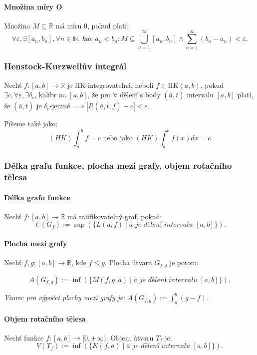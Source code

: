 \documentclass[10pt,a4paper]{article}
\newcommand{\N}{{\mathbb{N}}}
\newcommand{\R}{{\mathbb{R}}}
\begin{document}
\paragraph*{Množina míry O} Množina $M \subseteq \R$ má míru $0$, pokud platí: 
$$\forall \varepsilon, \exists [a_n, b_n], \forall n\in \N \textit{, kde } a_n < b_n: M\subseteq \bigcup_{n=1}^{\infty}[a_n, b_n] \land \sum_{n=1}^{\infty} (b_n - a_n) < \varepsilon.$$
\subsubsection{Henstock-Kurzweilův integrál} 
Nechť $f:[a,b] \to \R$ je HK-integrovatelná, neboli $f\in \text{HK}(a,b)$, pokud $\exists c, \forall \varepsilon, \exists \delta_c$, kalibr na $[a,b]$, 
že pro $\forall$ dělení s body $(\overline{a}, \overline{t})$ intervalu $[a, b]$ platí, že
$(\overline{a}, \overline{t}) \text{ je } \delta_c \text{-jemné } \implies |R(\overline{a}, \overline{t}, f) - c| < \varepsilon.$ 

Píšeme také jako:
\[
    (HK) \int_{a}^{b} f = c \text{ nebo jako } (HK)\int_{a}^{b} f(x) dx = c
\]

\subsubsection{Délka grafu funkce, plocha mezi grafy, objem rotačního tělesa}

\paragraph*{Délka grafu funkce} Nechť $f:[a,b]\to \R$ má ratifikovatelný graf, pokud:
\[
    \ell(G_f) := \sup (\{ L(\overline{a}, f) \mid \overline{a} \textit{ je dělení intervalu } [a,b] \}).
\]
\paragraph*{Plocha mezi grafy} 
Nechť $f,g:[a,b]\to \R$, kde $f \leq g$. Plocha útvaru $G_{f,g}$ je potom:

\[
    A(G_{f,g}):= \inf (\{ M(f, g, \overline{a}) \mid \overline{a} \textit{ je dělení intervalu } [a,b] \}).
\]

\textit{Vzorec pro výpočet plochy mezi grafy je: $\displaystyle A(G_{f,g}):= \int_{a}^{b}(g-f)$.}

\paragraph*{Objem rotačního tělesa} Nechť funkce $f:[a,b]\to [0, +\infty)$. Objem útvaru $T_f$ je:
\[
    V(T_f):= \inf(\{K(f, \overline{a}) \mid \overline{a} \textit{ je dělení intervalu } [a,b]\}).
\]
\end{document}
